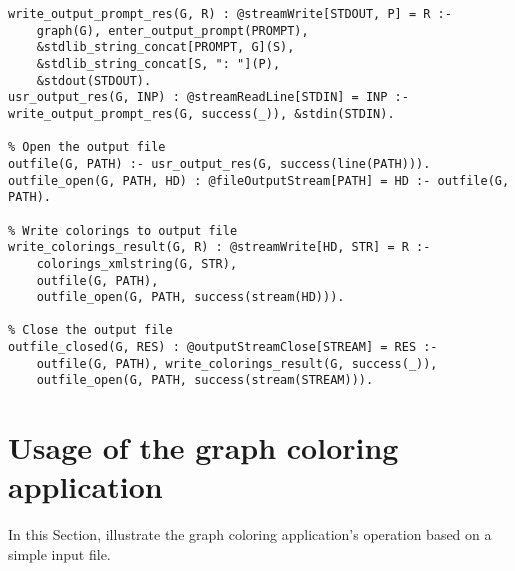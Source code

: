 \begin{lstlisting}[style=asp-code, label={lst:results-xml-graphcol-write-output}, caption={Writing Graph colorings to XML files.}]
% Prompt user for a path to which to write the calculated colorings for each graph
write_output_prompt_res(G, R) : @streamWrite[STDOUT, P] = R :- 
	graph(G), enter_output_prompt(PROMPT), 
	&stdlib_string_concat[PROMPT, G](S),
	&stdlib_string_concat[S, ": "](P),
	&stdout(STDOUT).
usr_output_res(G, INP) : @streamReadLine[STDIN] = INP :- write_output_prompt_res(G, success(_)), &stdin(STDIN).

% Open the output file
outfile(G, PATH) :- usr_output_res(G, success(line(PATH))).
outfile_open(G, PATH, HD) : @fileOutputStream[PATH] = HD :- outfile(G, PATH).

% Write colorings to output file
write_colorings_result(G, R) : @streamWrite[HD, STR] = R :- 
	colorings_xmlstring(G, STR), 
	outfile(G, PATH), 
	outfile_open(G, PATH, success(stream(HD))).

% Close the output file
outfile_closed(G, RES) : @outputStreamClose[STREAM] = RES :- 
	outfile(G, PATH), write_colorings_result(G, success(_)), 
	outfile_open(G, PATH, success(stream(STREAM))).
\end{lstlisting}

\section{Usage of the graph coloring application}

In this Section, illustrate the graph coloring application's operation based on a simple input file.

